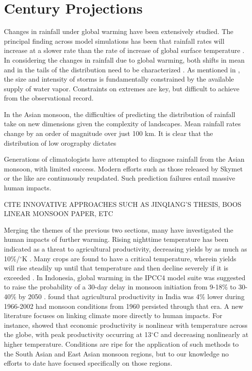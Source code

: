 \section{ Century Projections}

	Changes in rainfall under global warming have been extensively studied. The principal finding across model simulations has been that rainfall rates will increase at a slower rate than the rate of increase of global surface temperature \citep{Allen2002}. In considering the changes in rainfall due to global warming, both shifts in mean and in the tails of the distribution need to be characterized \cite{Pendergrass}. As mentioned in \citet{Trenberth}, the size and intensity of storms is fundamentally constrained by the available supply of water vapor. Constraints on extremes are key, but difficult to achieve from the observational record.
	

	In the Asian monsoon, the difficulties of predicting the distribution of rainfall take on new dimensions given the complexity of landscapes. Mean rainfall rates change by an order of magnitude over just 100 km. It is clear that the distribution of low orography dictates 

	Generations of climatologists have attempted to diagnose rainfall from the Asian monsoon, with limited success. Modern efforts such as those released by Skymet or the like are continuously reupdated. Such prediction failures entail massive human impacts.
	
	CITE INNOVATIVE APPROACHES SUCH AS JINQIANG'S THESIS, BOOS LINEAR MONSOON PAPER, ETC
	
	Merging the themes of the previous two sections, many have investigated the human impacts of further warming. Rising nighttime temperature has been indicated as a threat to agricultural productivity, decreasing yields by as much as 10\%/$^{\circ}$K \citep{Peng2004}. Many crops are found to have a critical temperature, wherein yields will rise steadily up until that temperature and then decline severely if it is exceeded \citep{Schlenker2009}. In Indonesia, global warming in the IPCC4 model suite was suggested to raise the probability of a 30-day delay in monsoon initiation from 9-18\% to 30-40\% by 2050 \citep{Naylor2007}. \citet{Auffhammer2012} found that agricultural productivity in India was 4\% lower during 1966-2002 had monsoon conditions from 1960 persisted through that era. A new literature focuses on linking climate more directly to human impacts. For instance, \citet{Burke2015} showed that economic productivity is nonlinear with temperature across the globe, with peak productivity occurring at 13$^{\circ}$C and decreasing nonlinearly at higher temperature.  Conditions are ripe for the application of such methods to the South Asian and East Asian monsoon regions, but to our knowledge no efforts to date have focused specifically on those regions.

